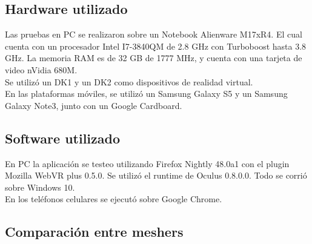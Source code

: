 \documentclass[12pt]{article}
\begin{document}
\subsection{Hardware utilizado}
Las pruebas en PC se realizaron sobre un Notebook Alienware M17xR4. El cual cuenta con un procesador Intel I7-3840QM de 2.8 GHz con Turboboost hasta 3.8 GHz. La memoria RAM es de 32 GB de 1777 MHz, y cuenta con una tarjeta de video nVidia 680M.
\\Se utilizó un DK1 y un DK2 como dispositivos de realidad virtual.
\\En las plataformas móviles, se utilizó un Samsung  Galaxy S5 y un Samsung  Galaxy Note3, junto con un Google Cardboard. 

\subsection{Software utilizado}
En PC la aplicación se testeo utilizando Firefox Nightly 48.0a1 con el plugin Mozilla WebVR plus 0.5.0. Se utilizó el runtime de Oculus 0.8.0.0. Todo se corrió sobre Windows 10.
\\En los teléfonos celulares se ejecutó sobre Google Chrome.

\subsection{Comparación entre meshers}
\end{document}
